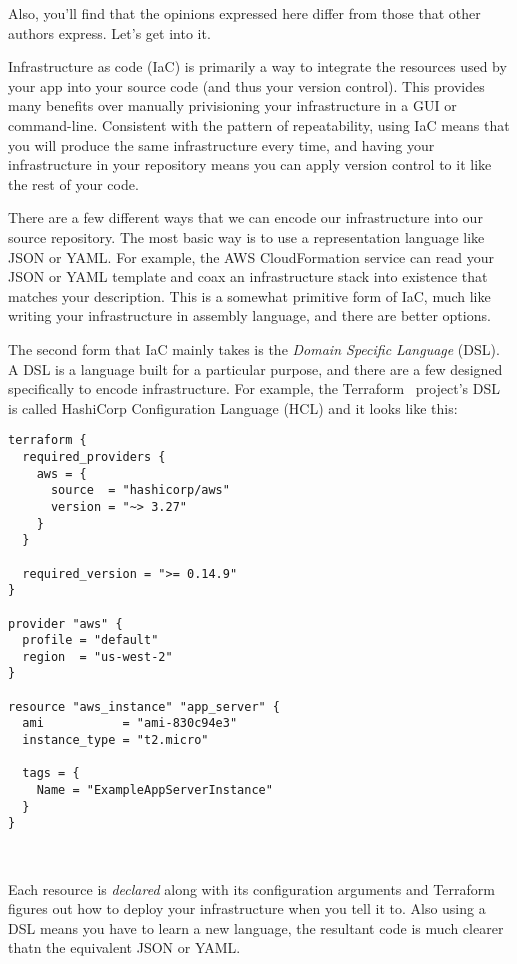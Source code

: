 \documentclass{article}
\newcommand{\noterm}[1]{\textit{#1}}
\newcommand{\term}[1]{\noterm{#1}\index{#1}}
\begin{document}
Also, you'll find that the opinions expressed here differ from those that other authors express. Let's get into it.

Infrastructure as code (IaC) is primarily a way to integrate the resources used by your app into your source code (and thus your version control).
This provides many benefits over manually privisioning your infrastructure in a GUI or command-line.
Consistent with the pattern of repeatability, using IaC means that you will produce the same infrastructure every time, and having your infrastructure in your repository means you can apply version control to it like the rest of your code.

There are a few different ways that we can encode our infrastructure into our source repository.
The most basic way is to use a representation language like JSON or YAML.
For example, the AWS CloudFormation service can read your JSON or YAML template and coax an infrastructure stack into existence that matches your description.
This is a somewhat primitive form of IaC, much like writing your infrastructure in assembly language, and there are better options.

The second form that IaC mainly takes is the \term{Domain Specific Language} (DSL).
A DSL is a language built for a particular purpose, and there are a few designed specifically to encode infrastructure.
For example, the Terraform~\cite{terraform} project's DSL is called HashiCorp Configuration Language (HCL) and it looks like this:

\begin{verbatim}
terraform {
  required_providers {
    aws = {
      source  = "hashicorp/aws"
      version = "~> 3.27"
    }
  }

  required_version = ">= 0.14.9"
}

provider "aws" {
  profile = "default"
  region  = "us-west-2"
}

resource "aws_instance" "app_server" {
  ami           = "ami-830c94e3"
  instance_type = "t2.micro"

  tags = {
    Name = "ExampleAppServerInstance"
  }
}
\end{verbatim}~\cite{terraform-example}

Each resource is \textit{declared} along with its configuration arguments and Terraform figures out how to deploy your infrastructure when you tell it to.
Also using a DSL means you have to learn a new language, the resultant code is much clearer thatn the equivalent JSON or YAML.
\end{document}
